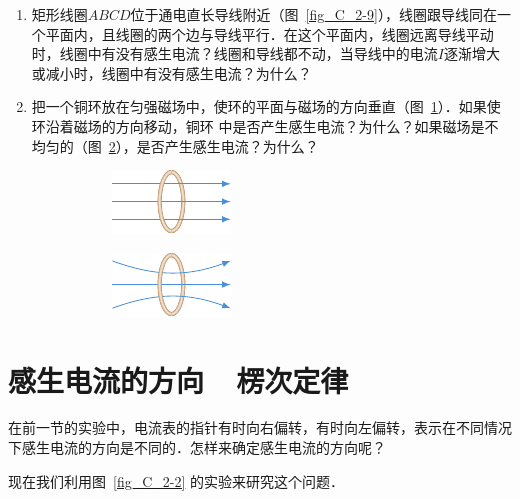 \begin{enumerate}
    \item 矩形线圈$ABCD$位于通电直长导线附近（图~\ref{fig_C_2-9}），线圈跟导线同在一个平面内，且线圈的两个边与导线平行．在这个平面内，线圈远离导线平动时，线圈中有没有感生电流？线圈和导线都不动，当导线中的电流$I$逐渐增大或减小时，线圈中有没有感生电流？为什么？
    \item 把一个铜环放在匀强磁场中，使环的平面与磁场的方向垂直（图~\ref{fig_C_2-10a}）．如果使环沿着磁场的方向移动，铜环
中是否产生感生电流？为什么？如果磁场是不均匀的（图~\ref{fig_C_2-10b}），是否产生感生电流？为什么？
\begin{figure}[htbp]
    \centering
    \begin{subfigure}{0.3\linewidth}
        \centering
        \includegraphics{fig/C/2-10a.pdf}
        \caption{}\label{fig_C_2-10a}
    \end{subfigure}
    \hfil
    \begin{subfigure}{0.3\linewidth}
        \centering
        \includegraphics{fig/C/2-10b.pdf}
        \caption{}\label{fig_C_2-10b}
    \end{subfigure}
    \caption{}\label{fig_C_2-10}
\end{figure}
\end{enumerate}


\section{感生电流的方向~~楞次定律}
在前一节的实验中，电流表的指针有时向右偏转，有时向左偏转，表示在不同情况下感生电流的方向是不同的．怎样来确定感生电流的方向呢？

现在我们利用图~\ref{fig_C_2-2} 的实验来研究这个问题．

